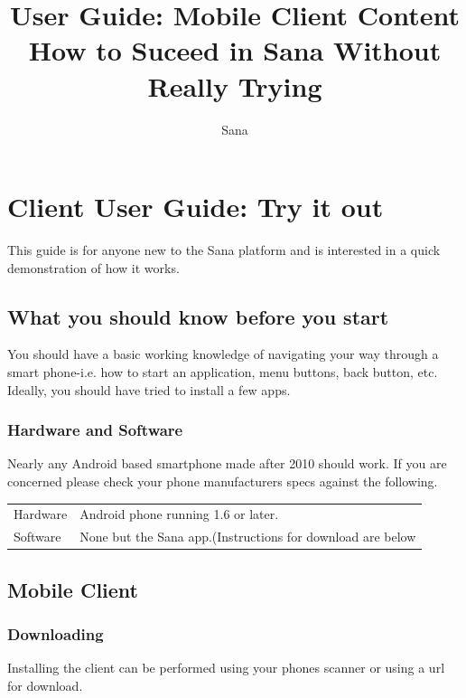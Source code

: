\documentclass[a4paper,10pt]{article}
\title{User Guide: Mobile Client Content\\How to Suceed in Sana Without Really Trying}
\author{Sana}
\begin{document}
\maketitle

\begin{abstract}

\end{abstract}

\section{Client User Guide: Try it out}
This guide is for anyone new to the Sana platform and is interested in a quick
demonstration of how it works. 

\subsection{What you should know before you start}
You should have a basic working knowledge of navigating your way through a smart
phone-i.e. how to start an application, menu buttons, back button, etc. Ideally,
you should have tried to install a few apps.

\subsubsection{Hardware and Software}
Nearly any Android based smartphone made after 2010 should work. If you are 
concerned please check your phone manufacturers specs against the following.

\begin{tabular}{ l l }
Hardware&Android phone running 1.6 or later. \\
Software&None but the Sana app.(Instructions for download are below}
\end{tabular}

\newpage

\subsection{Mobile Client}
\subsubsection{Downloading}
Installing the client can be performed using your phones scanner or using a url 
for download.
\end{document}

